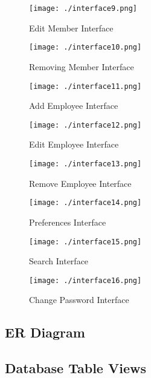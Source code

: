 \begin{figure}[H]
    \texttt{[image: ./interface9.png]}
    \caption{Edit Member Interface} \label{fig:edit-member-instance}
\end{figure}

\begin{figure}[H]
    \texttt{[image: ./interface10.png]}
    \caption{Removing Member Interface} \label{fig:removing-member-interface}
\end{figure}

\begin{figure}[H]
    \texttt{[image: ./interface11.png]}
    \caption{Add Employee Interface} \label{fig:adding-employee-interface}
\end{figure}

\begin{figure}[H]
    \texttt{[image: ./interface12.png]}
    \caption{Edit Employee Interface} \label{fig:edit-employee-interface}
\end{figure}

\begin{figure}[H]
    \texttt{[image: ./interface13.png]}
    \caption{Remove Employee Interface} \label{fig:removing-employee-interface}
\end{figure}

\begin{figure}[H]
    \texttt{[image: ./interface14.png]}
    \caption{Preferences Interface} \label{fig:preferences-interface}
\end{figure}

\begin{figure}[H]
    \texttt{[image: ./interface15.png]}
    \caption{Search Interface} \label{fig:search-interface}
\end{figure}

\begin{figure}[H]
    \texttt{[image: ./interface16.png]}
    \caption{Change Password Interface} \label{fig:change-password-interface}
\end{figure}

\subsection{ER Diagram}

\subsection{Database Table Views}

